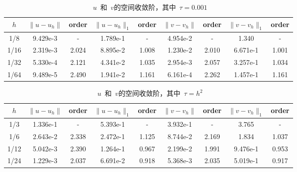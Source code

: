 \documentclass[twoside,UTF8]{nputhesis}
\begin{document}
\begin{table}[h]
	\caption{~$u$~和~$v$的空间收敛阶，其中~$\tau=0.001$}\label{label3}
	\begin{tabular*}{\hsize}{@{}@{\extracolsep{\fill}}ccccccccc@{}}
		\hline $h$ & $\| u-u_h\|$  & order   &$\| u-u_h\|_1$  &order   &  $\| v-v_h\|$    &order       & $\|v-v_h\|_1$    &order            \\
		\hline1/8  & 9.429e-3  & -           &1.789e-1      &-          &  4.954e-2    & -             &1.340      & -                               \\
		1/16 & 2.319e-3  & 2.024      &8.895e-2      & 1.008    &  1.230e-2    &  2.010       &6.671e-1      &  1.001                           \\
		1/32 & 5.330e-4  & 2.121      &4.341e-2      & 1.035    &  2.954e-3    &  2.057       &3.257e-1      & 1.034                      \\
		1/64 & 9.489e-5  & 2.490      &1.941e-2      & 1.161    &  6.161e-4    &  2.262       &1.457e-1      & 1.161                     \\
		
		\hline
	\end{tabular*}
\end{table}
\begin{table}[h]
	\centering
	\caption{~$u$~和~$v$的空间收敛阶，其中~$\tau=h^2$}\label{label4.2}
	\begin{tabular*}{\hsize}{@{}@{\extracolsep{\fill}}ccccccccc@{}}
		\hline$h$& $\| u-u_h\|$  & order   &$\| u-u_h\|_1$  &order   &  $\| v-v_h\|$    &order       & $\|v-v_h\|_1$    &order                          \\
		\hline1/3  & 1.336e-1  & -        &  5.393e-1         &  -       &  3.932e-1       &   -        & 3.765     &   -                          \\
		1/6  & 2.643e-2  & 2.338    & 2.472e-1        &1.125     &  8.744e-2      &  2.169     & 1.834     &1.037                       \\
		1/12  & 5.042e-3  & 2.390     & 1.264e-1        &0.967     &  2.199e-2       &  1.991    &9.476e-1       &0.953                    \\
		1/24  & 1.229e-3  & 2.037     & 6.691e-2         &0.918     &  5.368e-3      &  2.035     &5.019e-1      &0.917            \\
		
		\hline
	\end{tabular*}
\end{table}
\end{document}
